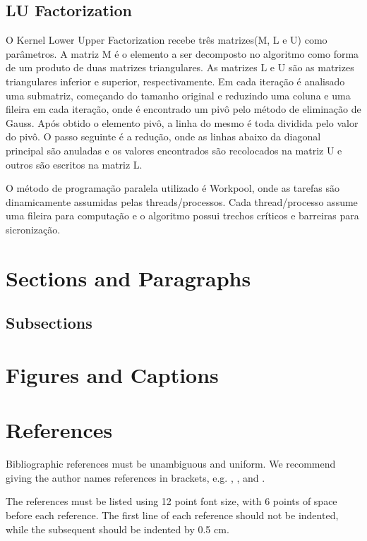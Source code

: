 \documentclass[12pt]{article}
\begin{document}
\subsection{LU Factorization}

O Kernel Lower Upper Factorization recebe três matrizes(M, L e U) como parâmetros. A matriz M é o elemento a ser decomposto no algoritmo como forma de um produto de duas matrizes triangulares. As matrizes L e U são as matrizes triangulares inferior e superior, respectivamente. Em cada iteração é analisado uma submatriz, começando do tamanho original e reduzindo uma coluna e uma fileira em cada iteração, onde é encontrado um pivô pelo método de eliminação de Gauss. Após obtido o elemento pivô, a linha do mesmo é toda dividida pelo valor do pivô. O passo seguinte é a redução, onde as linhas abaixo da diagonal principal são anuladas e os valores encontrados são recolocados na matriz U e outros são escritos na matriz L.

O método de programação paralela utilizado é Workpool, onde as tarefas são dinamicamente assumidas pelas threads/processos. Cada thread/processo assume uma fileira para computação e o algoritmo possui trechos críticos e barreiras para sicronização. 


\section{Sections and Paragraphs}



\subsection{Subsections}



\section{Figures and Captions}\label{sec:figs}







\section{References}

Bibliographic references must be unambiguous and uniform.  We recommend giving
the author names references in brackets, e.g. \cite{knuth:84},
\cite{boulic:91}, and \cite{smith:99}.

The references must be listed using 12 point font size, with 6 points of space
before each reference. The first line of each reference should not be
indented, while the subsequent should be indented by 0.5 cm.



\end{document}
